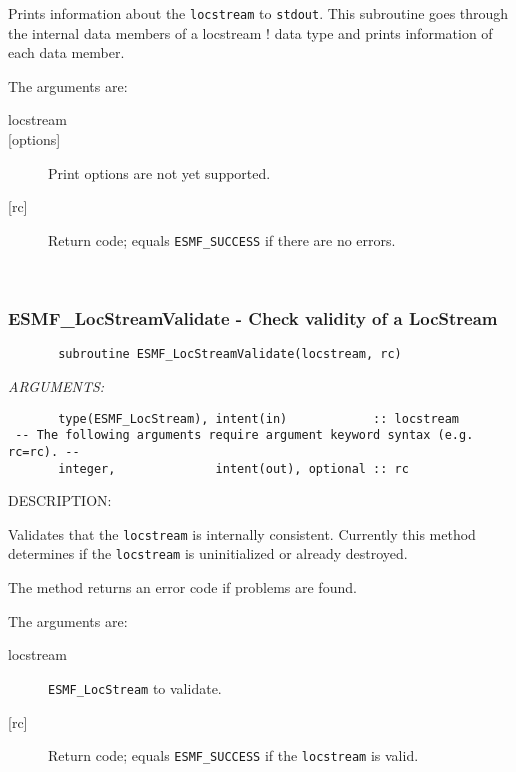        Prints information about the {\tt locstream} to {\tt stdout}.
    This subroutine goes through the internal data members of a locstream
  !  data type and prints information of each data member.
  
       The arguments are:
       \begin{description}
       \item [locstream]
       \item [{[options]}]
             Print options are not yet supported.
       \item [{[rc]}]
             Return code; equals {\tt ESMF\_SUCCESS} if there are no errors.
       \end{description}
   
 
\mbox{}\hrulefill\ 
 
\subsubsection [ESMF\_LocStreamValidate] {ESMF\_LocStreamValidate - Check validity of a LocStream}


 
\begin{verbatim}       subroutine ESMF_LocStreamValidate(locstream, rc)\end{verbatim}{\em ARGUMENTS:}
\begin{verbatim}       type(ESMF_LocStream), intent(in)            :: locstream 
 -- The following arguments require argument keyword syntax (e.g. rc=rc). --
       integer,              intent(out), optional :: rc   \end{verbatim}
{\sf DESCRIPTION:\\ }


        Validates that the {\tt locstream} is internally consistent.
        Currently this method determines if the {\tt locstream} is uninitialized 
        or already destroyed. 
  
        The method returns an error code if problems are found.  
  
       The arguments are:
       \begin{description}
       \item [locstream]
             {\tt ESMF\_LocStream} to validate.
       \item [{[rc]}]
             Return code; equals {\tt ESMF\_SUCCESS} if the {\tt locstream} 
             is valid.
       \end{description}
  
\setlength{\parskip}{\oldparskip}
\setlength{\parindent}{\oldparindent}
\setlength{\baselineskip}{\oldbaselineskip}
